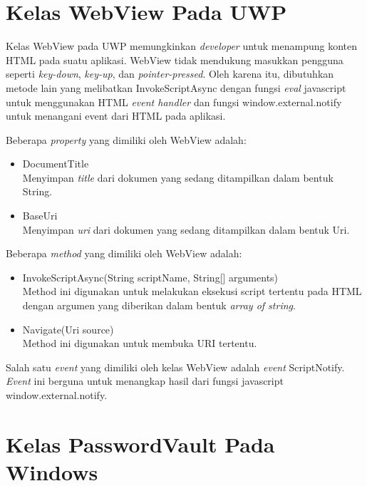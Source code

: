 \section{Kelas WebView Pada UWP}
\label{sec:webview}

Kelas WebView pada UWP memungkinkan \textit{developer} untuk menampung konten HTML pada suatu aplikasi\cite{WinAPI:2016}. WebView tidak mendukung masukkan pengguna seperti \textit{key-down}, \textit{key-up}, dan \textit{pointer-pressed}. Oleh karena itu, dibutuhkan metode lain yang melibatkan InvokeScriptAsync dengan fungsi \textit{eval} javascript untuk menggunakan HTML \textit{event handler} dan fungsi window.external.notify untuk menangani event dari HTML pada aplikasi.

Beberapa \textit{property} yang dimiliki oleh WebView adalah:

\begin{itemize}
    \item{DocumentTitle\\Menyimpan \textit{title} dari dokumen yang sedang ditampilkan dalam bentuk String.}
    \item{BaseUri\\Menyimpan \textit{uri} dari dokumen yang sedang ditampilkan dalam bentuk Uri.}
\end{itemize}

Beberapa \textit{method} yang dimiliki oleh WebView adalah:

\begin{itemize}
    \item{InvokeScriptAsync(String scriptName, String[] arguments)\\Method ini digunakan untuk melakukan eksekusi script tertentu pada HTML dengan argumen yang diberikan dalam bentuk \textit{array of string}.}
    \item{Navigate(Uri source)\\Method ini digunakan untuk membuka URI tertentu.}
\end{itemize}

Salah satu \textit{event} yang dimiliki oleh kelas WebView adalah \textit{event} ScriptNotify. \textit{Event} ini berguna untuk menangkap hasil dari fungsi javascript window.external.notify.



\section{Kelas PasswordVault Pada Windows}
\label{sec:passwordvault}

